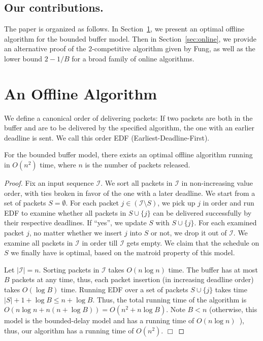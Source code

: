 \documentclass[final, 11pt]{article}
\begin{document}
\subsection{Our contributions.}

The paper is organized as follows. In Section~\ref{sec:offline}, we present an optimal offline algorithm for the bounded buffer model. Then in Section~\ref{sec:online}, we provide an alternative proof of the $2$-competitive algorithm given by Fung, as well as the lower bound $2 - 1 / B$ for a broad family of online algorithms.



\section{An Offline Algorithm}
\label{sec:offline}

We define a canonical order of delivering packets: If two packets are both in the buffer and are to be delivered by the specified algorithm, the one with an earlier deadline is sent. We call this order EDF (Earliest-Deadline-First).

\begin{theorem}
For the bounded buffer model, there exists an optimal offline algorithm running in $O(n^2)$ time, where $n$ is the number of packets released.
\end{theorem}

\begin{proof}
Fix an input sequence $\mathcal I$. We sort all packets in $\mathcal I$ in non-increasing value order, with ties broken in favor of the one with a later deadline. We start from a set of packets $S = \emptyset$. For each packet $j \in ({\mathcal I} \setminus S)$, we pick up $j$ in order and run EDF to examine whether all packets in $S \cup \{j\}$ can be delivered successfully by their respective deadlines. If ``yes'', we update $S$ with $S \cup \{j\}$. For each examined packet $j$, no matter whether we insert $j$ into $S$ or not, we drop it out of $\mathcal I$. We examine all packets in $\mathcal I$ in order till $\mathcal I$ gets empty. We claim that the schedule on $S$ we finally have is optimal, based on the matroid property of this model.

Let $|{\mathcal I}| = n$. Sorting packets in $\mathcal I$ takes $O(n \log n)$ time. The buffer has at most $B$ packets at any time, thus, each packet insertion (in increasing deadline order) takes $O(\log B)$ time. Running EDF over a set of packets $S \cup \{j\}$ takes time $|S| + 1 + \log B \le n + \log B$. Thus, the total running time of the algorithm is $O(n \log n + n (n + \log B)) = O(n^2 + n \log B)$. Note $B < n$ (otherwise, this model is the bounded-delay model and has a running time of $O(n \log n)$~\cite{KLMPSS04}), thus, our algorithm has a running time of $O(n^2)$. $\Box$
\end{proof}
\end{document}
